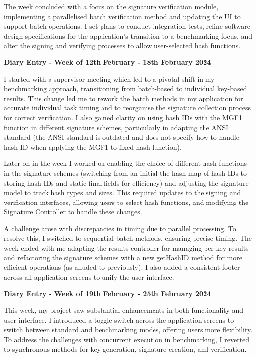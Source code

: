 \documentclass[]{final_report}
\theoremstyle{definition}
\begin{document}
The week concluded with a focus on the signature verification module, implementing a parallelised
batch verification method and updating the UI to support batch operations. I set plans to conduct
integration tests, refine software design specifications for the application's transition to a
benchmarking focus, and alter the signing and verifying processes to allow user-selected hash
functions.

\textbf{Diary Entry - Week of 12th February - 18th February 2024}

I started with a supervisor meeting which led to a pivotal shift in my benchmarking approach,
transitioning from batch-based to individual key-based results. This change led me to rework the
batch methods in my application for accurate individual task timing and to reorganise the signature
collection process for correct verification. I also gained clarity on using hash IDs with the MGF1
function in different signature schemes, particularly in adapting the ANSI standard (the ANSI
standard is outdated and does not specify how to handle hash ID when applying the MGF1 to fixed hash
function).

Later on in the week I worked on enabling the choice of different hash functions in the signature
schemes (switching from an initial the hash map of hash IDs to storing hash IDs and static final
fields for efficiency) and adjusting the signature model to track hash types and sizes. This
required updates to the signing and verification interfaces, allowing users to select hash
functions, and modifying the Signature Controller to handle these changes.

A challenge arose with discrepancies in timing due to parallel processing. To resolve this, I
switched to sequential batch methods, ensuring precise timing. The week ended with me adapting the
results controller for managing per-key results and refactoring the signature schemes with a new
getHashID method for more efficient operations (as alluded to previously). I also added a consistent
footer across all application screens to unify the user interface.

\textbf{Diary Entry - Week of 19th February - 25th February 2024}

This week, my project saw substantial enhancements in both functionality and user interface. I
introduced a toggle switch across the application screens to switch between standard and
benchmarking modes, offering users more flexibility. To address the challenges with concurrent
execution in benchmarking, I reverted to synchronous methods for key generation, signature creation,
and verification.
\end{document}
